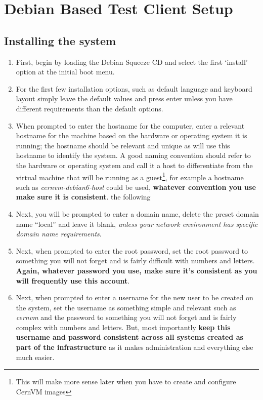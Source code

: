 \section{Debian Based Test Client Setup}
\subsection{Installing the system}
\label{sec:debianinstall}
\flushleft
\begin{enumerate}
\item 	First, begin by loading the Debian Squeeze CD and select the first `install' option at the initial boot menu.

\item	For the first few installation options, such as default language and keyboard layout simply leave the default values
		and press enter unless you have different requirements than the default options.

\item	When prompted to enter the hostname for the computer, enter a relevant hostname for the machine based on the hardware or 
		operating system it is running; the hostname should be relevant and unique as \tapper will use this hostname to identify the 
		system. A good naming convention should refer to the hardware or operating system and call it a host to differentiate from the 
		virtual machine that will be running as a guest\footnote{This will make more sense later when you have to create and configure 
		CernVM images}, for example a hostname such as \emph{cernvm-debian6-host} could be used, {\bf whatever convention you use make 
		sure it is consistent}.
the following
\item	Next, you will be prompted to enter a domain name, delete the preset domain name ``local'' and leave it blank, \emph{unless
		your network environment has specific domain name requirements}.

\item	Next, when prompted to enter the root password, set the root password to something you will not forget and is
		fairly difficult with numbers and letters. {\bf Again, whatever password you use,  make sure it's consistent as you will 	
		frequently use this account}.

\item 	Next, when prompted to enter a username for the new user to be created on the system, set the username as something simple and 
		relevant such as \emph{cernvm} and the password to something you will not forget and is fairly complex with numbers and letters. 
		But, most importantly {\bf keep this username and password consistent across all systems created as part of the infrastructure} 
		as it makes administration and everything else much easier.


\end{enumerate}
